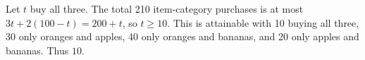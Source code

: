Let $t$ buy all three. The total 210 item-category purchases is at most $3t+2(100-t)=200+t$, so $t\ge10$. This is attainable with 10 buying all three, 30 only oranges and apples, 40 only oranges and bananas, and 20 only apples and bananas. Thus $\boxed{10}$.
